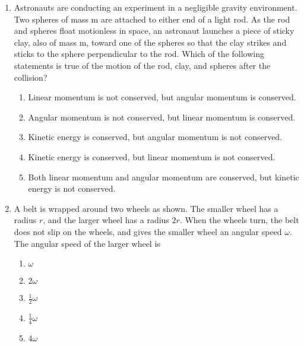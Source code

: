 \documentclass{../../oss-apphys}
\begin{document}
\begin{multicols}{2}
\begin{enumerate}[leftmargin=18pt]
  \item Astronauts are conducting an experiment in a negligible gravity
    environment. Two spheres of mass m are attached to either end of a light
    rod. As the rod and spheres float motionless in space, an astronaut
    launches a piece of sticky clay, also of mass m, toward one of the spheres
    so that the clay strikes and sticks to the sphere perpendicular to the rod.
    Which of the following statements is true of the motion of the rod, clay,
    and spheres after the collision?
    \begin{center}
    \end{center}
    \begin{enumerate}[noitemsep,topsep=0pt,leftmargin=18pt,label=(\Alph*)]
    \item Linear momentum is not conserved, but angular momentum is conserved.
    \item Angular momentum is not conserved, but linear momentum is conserved.
    \item Kinetic energy is conserved, but angular momentum is not conserved.
    \item Kinetic energy is conserved, but linear momentum is not conserved.
    \item Both linear momentum and angular momentum are conserved, but kinetic
      energy is not conserved.
    \end{enumerate}

  \item A belt is wrapped around two wheels as shown. The smaller wheel has
    a radius $r$, and the larger wheel has a radius $2r$. When the wheels turn,
    the belt does not slip on the wheels, and gives the smaller wheel an
    angular speed $\omega$. The angular speed of the larger wheel is
    \begin{center}
    \end{center}
    \begin{enumerate}[noitemsep,topsep=0pt,leftmargin=18pt,label=(\Alph*)]
    \item $\displaystyle \omega$
    \item $\displaystyle 2\omega$
    \item $\displaystyle \frac{1}{2}\omega$
    \item $\displaystyle \frac{1}{4}\omega$
    \item $\displaystyle 4\omega$
    \end{enumerate}
    \columnbreak



\end{enumerate}
\end{multicols}
\end{document}
